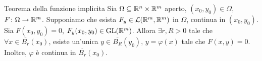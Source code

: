 \documentclass[a4paper]{article}
\begin{document}
\begin{radioactive}
\begin{snippettheorem}{Teorema della funzione implicita}
    Sia \(\Omega \subseteq \mathbb{R}^n \times \mathbb{R}^m\) aperto,
    \((x_0, y_0) \in \Omega\), \(F \colon \Omega \to \mathbb{R}^m\).
    Supponiamo che esista \(F_y \in \mathcal{L}(\mathbb{R}^m, \mathbb{R}^m)\)
    in \(\Omega\), continua in \((x_0, y_0)\).
    Sia \(F(x_0, y_0) = 0\), \(F_y(x_0, y_0) \in \text{GL}(\mathbb{R}^m)\).
    Allora \(\exists r,R > 0\) tale che \(\forall x \in \overline{B_r}(x_0)\),
    esiste un'unica \(y \in \overline{B_R}(y_0)\), \(y = \varphi(x)\)
    tale che \(F(x,y) = 0\).
    Inoltre, \(\varphi\) è continua in \(\overline{B_r}(x_0)\).
\end{snippettheorem}
\end{radioactive}
\end{document}
